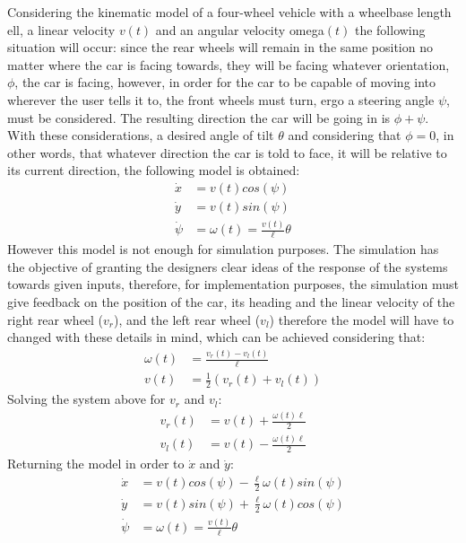 Considering the kinematic model of a four-wheel vehicle with a wheelbase length \gls{ell}, a linear velocity $v(t)$ and an angular velocity \gls{omega}$(t)$ the following situation will occur: since the rear wheels will remain in the same position no matter where the car is facing towards, they will be facing whatever orientation, $\phi$, the car is facing, however, in order for the car to be capable of moving into wherever the user tells it to, the front wheels must turn, ergo a steering angle $\psi$, must be considered. The resulting direction the car will be going in is $\phi + \psi$. With these considerations, a desired angle of tilt $\theta$ and considering that $\phi=0$, in other words, that whatever direction the car is told to face, it will be relative to its current direction, the following model is obtained:
\begin{align}
\dot{x}&=v(t) cos(\psi)\\
\dot{y}&=v(t) sin(\psi)\\
\dot{\psi}&=\omega(t)=\frac{v(t)}{\ell}\theta
\end{align}
However this model is not enough for simulation purposes. The simulation has the objective of granting the designers clear ideas of the response of the systems towards given inputs, therefore, for implementation purposes, the simulation must give feedback on the position of the car, its heading and the linear velocity of the right rear wheel ($v_r$), and the left rear wheel ($v_l$) therefore the model will have to changed with these details in mind, which can be achieved considering that:
\begin{align}
\omega(t)&=\frac{v_r(t)-v_l(t)}{\ell}\\
v(t)&=\frac{1}{2}(v_r(t)+v_l(t))
\end{align}
Solving the system above for $v_r$ and $v_l$:
\begin{align}
v_ r(t)&=v(t)+ \frac{\omega(t)\ell}{2}\\
v_l(t)&=v(t)-\frac{\omega(t)\ell}{2}
\end{align}
Returning the model in order to $\dot{x}$ and $ \dot{y}$:
\begin{align}
\dot{x}&=v(t) cos(\psi)-\frac{\ell}{2}\omega(t) sin(\psi)\\
\dot{y}&=v(t) sin(\psi)+\frac{\ell}{2}\omega(t) cos(\psi)\\
\dot{\psi}&=\omega(t)=\frac{v(t)}{\ell}\theta
\label{equ:sysModel}
\end{align}

